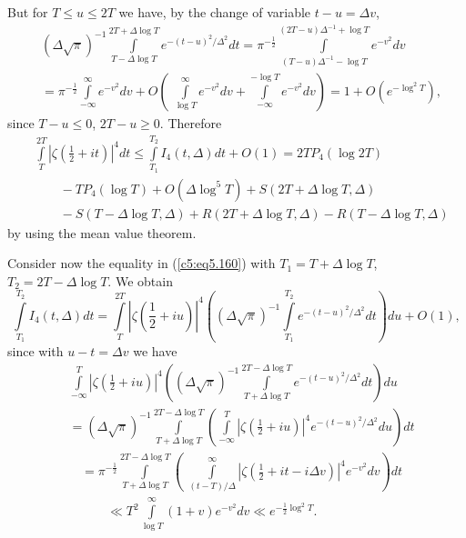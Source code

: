 But for $T \leq u \leq 2 T$ we have, by the change of variable $t - u
= \Delta v$, 
\begin{align*}
& (\Delta\sqrt{\pi})^{-1} \int\limits^{2T + \Delta \log T}_{T - \Delta
    \log T} e^{-(t-u)^2/\Delta^2} dt = \pi^{-\frac{1}{2}}
  \int\limits^{(2T - u)\Delta^{-1} + \log T}_{(T-u)\Delta^{-1} -\log
    T}e^{-v^2} dv\\ 
& = \pi^{-\frac{1}{2}} \int\limits^\infty_{-\infty} e^{-v^2} dv + O
  \left(\;\int\limits^\infty_{\log T} e^{-v^2} dv + \int\limits^{-\log
    T}_{-\infty} e^{-v^2} dv \right) = 1 + O \left(e^{-\log^2 T}\right), 
\end{align*}\pageoriginale
since $T - u \leq 0$, $2 T - u \geq 0$. Therefore
\begin{align*}
& \int\limits^{2T}_T \left|\zeta \left(\frac{1}{2} + it
  \right)\right|^4 dt \leq \int\limits^{T_2}_{T_1} I_4 (t,\Delta) dt +
  O (1) = 2T P_4 (\log 2T) \\ 
& \qquad - T P_4 (\log T) + O(\Delta \log^5 T) + S (2T + \Delta \log
  T, \Delta)\\ 
& \qquad  - S (T - \Delta \log T, \Delta)  + R (2T + \Delta \log T,
  \Delta) - R (T -\Delta \log T, \Delta) 
\end{align*}
by using the mean value theorem.

Consider now the equality in (\ref{c5:eq5.160}) with $T_1 = T + \Delta
\log T$,\break $T_2 = 2T -\Delta \log T$. We obtain 
$$
\int\limits^{T_2}_{T_1} I_4 (t,\Delta) dt = \int\limits^{2T}_T
\left|\zeta \left(\frac{1}{2} + iu \right)\right|^4 \left((\Delta
\sqrt{\pi})^{-1} \int\limits^{T_2}_{T_1} e^{-(t-u)^2 /\Delta^2}
dt\right) du + O (1), 
$$
since with $u -t = \Delta v$ we have 
\begin{align*}
& \int\limits^{T}_{-\infty} \left|\zeta \left(\frac{1}{2} + iu
  \right)\right|^4 
  \left((\Delta \sqrt{\pi})^{-1} \int\limits^{2T -\Delta \log T}_{T +
    \Delta \log T} e^{-(t-u)^2 /\Delta^2} dt \right) du\\ 
& = (\Delta \sqrt{\pi})^{-1} \int\limits^{2T - \Delta \log T}_{T +
    \Delta \log T} \left( \int\limits^T_{-\infty} \left|\zeta
  \left(\frac{1}{2} + i u \right)\right|^4 e^{-(t-u)^2/\Delta^2}
  du\right) 
  dt 
\end{align*}
\begin{align*}
& = \pi^{-\frac{1}{2}} \int\limits^{2T - \Delta \log T}_{T + \Delta
    \log T} \left(\;\int\limits^\infty_{(t-T)/\Delta} \left|\zeta
  \left(\frac{1}{2} + it - i \Delta v \right)\right|^4 e^{-v^2} dv
  \right)dt\\ 
& \qquad \ll T^2 \int\limits^\infty_{\log T} (1+v) e^{-v^2} dv \ll
  e^{-\frac{1}{2} \log^2 T}.  
\end{align*}

